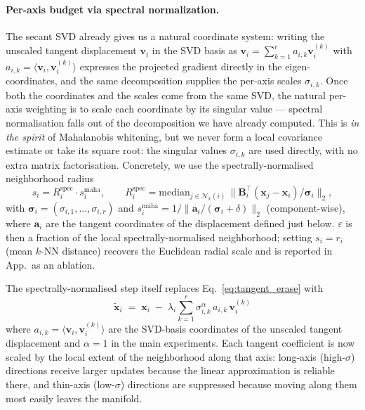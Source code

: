 \paragraph{Per-axis budget via spectral normalization.}
The secant SVD already gives us a natural coordinate system: writing the unscaled tangent displacement $\mathbf{v}_i$ in the SVD basis as $\mathbf{v}_i = \sum_{k=1}^{r} a_{i,k} \mathbf{v}_i^{(k)}$ with $a_{i,k} = \langle \mathbf{v}_i, \mathbf{v}_i^{(k)} \rangle$ expresses the projected gradient directly in the eigen-coordinates, and the same decomposition supplies the per-axis scales $\sigma_{i,k}$. Once both the coordinates and the scales come from the same SVD, the natural per-axis weighting is to scale each coordinate by its singular value --- spectral normalisation falls out of the decomposition we have already computed. This is \emph{in the spirit} of Mahalanobis whitening, but we never form a local covariance estimate or take its square root: the singular values $\sigma_{i,k}$ are used directly, with no extra matrix factorisation. Concretely, we use the spectrally-normalised neighborhood radius
\begin{equation}
\label{eq:s_spectral}
s_i = R_i^{\mathrm{spec}} \cdot s_i^{\mathrm{maha}}, \qquad
R_i^{\mathrm{spec}} = \mathrm{median}_{j \in \mathcal{N}_k(i)} \, \|\mathbf{B}_i^\top (\mathbf{x}_j - \mathbf{x}_i) / \boldsymbol\sigma_i \|_2,
\end{equation}
with $\boldsymbol\sigma_i = (\sigma_{i,1}, \ldots, \sigma_{i,r})$ and $s_i^{\mathrm{maha}} = 1 / \|\boldsymbol{a}_i / (\boldsymbol\sigma_i + \delta)\|_2$ (component-wise), where $\boldsymbol{a}_i$ are the tangent coordinates of the displacement defined just below. $\varepsilon$ is then a fraction of the local spectrally-normalised neighborhood; setting $s_i = r_i$ (mean $k$-NN distance) recovers the Euclidean radial scale and is reported in App.\ as an ablation.

The spectrally-normalised step itself replaces Eq.~\ref{eq:tangent_erase} with
\begin{equation}
\label{eq:tangent_erase_sigma}
\boxed{\;\;
\tilde{\mathbf{x}}_i \;=\; \mathbf{x}_i \;-\; \lambda_i \sum_{k=1}^{r} \sigma_{i,k}^{\alpha} \, a_{i,k} \, \mathbf{v}_i^{(k)}
\;\;}
\end{equation}
where $a_{i,k} = \langle \mathbf{v}_i, \mathbf{v}_i^{(k)} \rangle$ are the SVD-basis coordinates of the unscaled tangent displacement and $\alpha = 1$ in the main experiments. Each tangent coefficient is now scaled by the local extent of the neighborhood along that axis: long-axis (high-$\sigma$) directions receive larger updates because the linear approximation is reliable there, and thin-axis (low-$\sigma$) directions are suppressed because moving along them most easily leaves the manifold.

